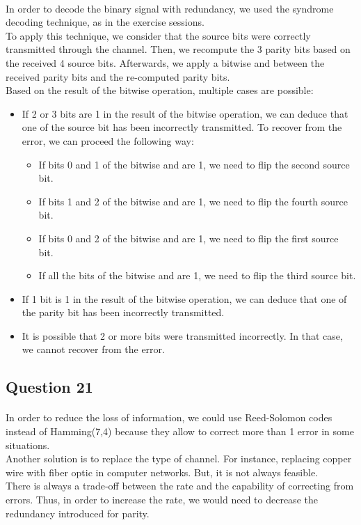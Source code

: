 \documentclass[a4paper, 11pt, oneside]{article}
\begin{document}
\paragraph{}In order to decode the binary signal with redundancy, we used the syndrome decoding technique, as in the exercise sessions.\\
To apply this technique, we consider that the source bits were correctly transmitted through the channel. Then, we recompute the 3 parity bits based on the received 4 source bits.
Afterwards, we apply a bitwise and between the received parity bits and the re-computed parity bits.\\
Based on the result of the bitwise operation, multiple cases are possible:
\begin{itemize}
    \item If 2 or 3 bits are 1 in the result of the bitwise operation, we can deduce that one of the source bit has been incorrectly transmitted.
    To recover from the error, we can proceed the following way:
        \begin{itemize}
            \item If bits 0 and 1 of the bitwise and are 1, we need to flip the second source bit.
            \item If bits 1 and 2 of the bitwise and are 1, we need to flip the fourth source bit.
            \item If bits 0 and 2 of the bitwise and are 1, we need to flip the first source bit.
            \item If all the bits of the bitwise and are 1, we need to flip the third source bit.
        \end{itemize}
    \item If 1 bit is 1 in the result of the bitwise operation, we can deduce that one of the parity bit has been incorrectly transmitted.
    \item It is possible that 2 or more bits were transmitted incorrectly. In that case, we cannot recover from the error.
\end{itemize}


\subsection{Question 21}
\paragraph{}In order to reduce the loss of information, we could use Reed-Solomon codes instead of Hamming(7,4) because they allow to correct more than 1 error
in some situations.\\
Another solution is to replace the type of channel. For instance, replacing copper wire with fiber optic in computer networks.
But, it is not always feasible.\\
There is always a trade-off between the rate and the capability of correcting from errors. Thus, in order to increase the rate,
we would need to decrease the redundancy introduced for parity.

\end{document}
